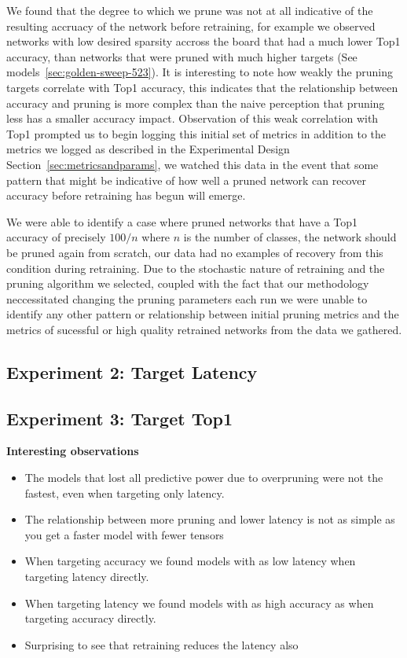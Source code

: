 \documentclass[../Dissertation.tex]{subfiles}
\begin{document}
We found that the degree to which we prune was not at all indicative of the resulting accruacy of the network before retraining, for example we observed networks with low desired sparsity accross the board that had a much lower Top1 accuracy, than networks that were pruned with much higher targets (See models~\ref{sec:golden-sweep-523}).
It is interesting to note how weakly the pruning targets correlate with Top1 accuracy, this indicates that the relationship between accuracy and pruning is more complex than the naive perception that pruning less has a smaller accuracy impact.
Observation of this weak correlation with Top1 prompted us to begin logging this initial set of metrics in addition to the metrics we logged as described in the Experimental Design Section~\ref{sec:metricsandparams}, we watched this data in the event that some pattern that might be indicative of how well a pruned network can recover accuracy before retraining has begun will emerge.

We were able to identify a case where pruned networks that have a Top1 accuracy of precisely $100 / n$ where $n$ is the number of classes, the network should be pruned again from scratch, our data had no examples of recovery from this condition during retraining.
Due to the stochastic nature of retraining and the pruning algorithm we selected, coupled with the fact that our methodology neccessitated changing the pruning parameters each run we were unable to identify any other pattern or relationship between initial pruning metrics and the metrics of sucessful or high quality retrained networks from the data we gathered. 



\subsection{Experiment 2: Target Latency}

\subsection{Experiment 3: Target Top1}

\textbf{Interesting observations}
\begin{itemize}
    \item The models that lost all predictive power due to overpruning were not the fastest, even when targeting only latency.
    \item The relationship between more pruning and lower latency is not as simple as you get a faster model with fewer tensors
    \item When targeting accuracy we found models with as low latency when targeting latency directly.
    \item When targeting latency we found models with as high accuracy as when targeting accuracy directly.
    \item Surprising to see that retraining reduces the latency also
\end{itemize}
\end{document}
